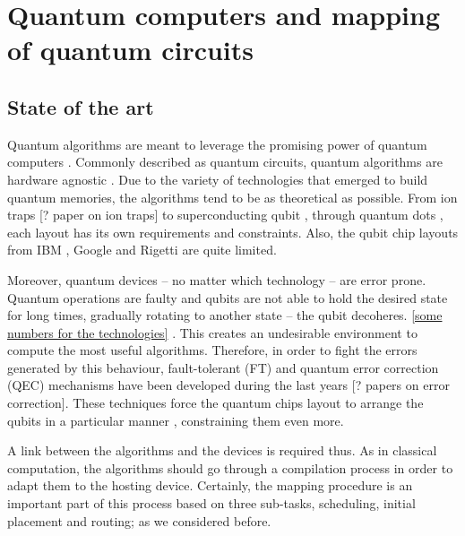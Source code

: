 
\chapter*{Quantum computers and mapping of quantum circuits}
\label{sec:org236b376}
\section*{State of the art}
\label{sec:org506ae1c}

Quantum algorithms are meant to leverage the promising power of quantum computers \cite{coles18:quant_algor_implem_begin}.
Commonly described as quantum circuits, quantum algorithms are hardware agnostic \cite{Nielsen_2009}.
Due to the variety of technologies that emerged to build quantum memories, the algorithms tend to be as theoretical as possible.
From ion traps [? paper on ion traps] to superconducting qubit \cite{Barends_2014}, through quantum dots \cite{Hill_2015,Li_2018}, each layout has its own requirements and constraints.
Also, the qubit chip layouts from IBM \cite{IBM_QX}, Google \cite{boixo16:charac_quant_suprem_near_term_devic} and Rigetti \cite{Sete_2016} are quite limited.

Moreover, quantum devices -- no matter which technology -- are error prone.
Quantum operations are faulty and qubits are not able to hold the desired state for long times, gradually rotating to another state -- the qubit decoheres.
\uline{[some numbers for the technologies]} \cite{O_Brien_2017}.
This creates an undesirable environment to compute the most useful algorithms.
Therefore, in order to fight the errors generated by this behaviour, fault-tolerant (FT) and quantum error correction (QEC) mechanisms have been developed during the last years \cite{Nielsen_2009} [? papers on error correction].
These techniques force the quantum chips layout to arrange the qubits in a particular manner \cite{Versluis_2017}, constraining them even more.

A link between the algorithms and the devices is required \cite{Fu_2016} thus.
As in classical computation, the algorithms should go through a compilation process in order to adapt them to the hosting device.
Certainly, the mapping procedure is an important part of this process based on three sub-tasks, scheduling, initial placement and routing; as we considered before.

